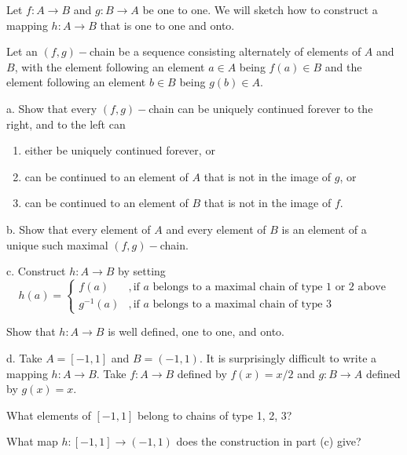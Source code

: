 \begin{exercise}{5}
    Let $f:A \rightarrow B$ and $g: B \rightarrow A$ be one to one. We will sketch how to construct a mapping $h: A \rightarrow B$ that is one to one and onto.

    Let an $(f, g)-$chain be a sequence consisting alternately of elements of $A$ and $B$, with the element following an element $a \in A$ being $f(a) \in B$ and the element following an element $b \in B$ being $g(b) \in A$.

    a. Show that every $(f, g)-$chain can be uniquely continued forever to the right, and to the left can
    \begin{enumerate}
        \item either be uniquely continued forever, or
        \item can be continued to an element of $A$ that is not in the image of $g$, or
        \item can be continued to an element of $B$ that is not in the image of $f$.
    \end{enumerate}

    b. Show that every element of $A$ and every element of $B$ is an element of a unique such maximal $(f,g)-$chain.

    c. Construct $h: A \rightarrow B$ by setting
    $$h(a) =  \begin{cases} 
      f(a) &, \text{if $a$ belongs to a maximal chain of type 1 or 2 above} \\
      g^{-1}(a) &, \text{if $a$ belongs to a maximal chain of type 3}
   \end{cases}$$

   Show that $h: A \rightarrow B$ is well defined, one to one, and onto.

   d. Take $A = [-1, 1]$ and $B = (-1, 1)$. It is surprisingly difficult to write a mapping $h: A \rightarrow B$. Take $f: A \rightarrow B$ defined by $f(x) = x/2$ and $g: B \rightarrow A$ defined by $g(x) = x$.

   What elements of $[-1, 1]$ belong to chains of type 1, 2, 3?

   What map $h: [-1, 1] \rightarrow (-1, 1)$ does the construction in part (c) give?
\end{exercise}


